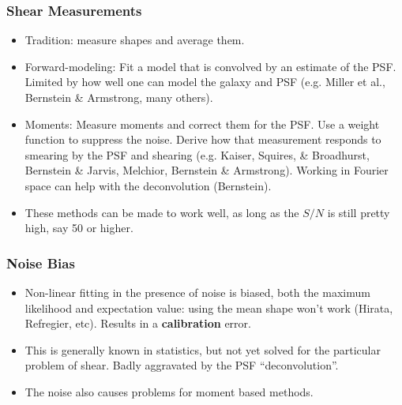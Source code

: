 \documentclass{beamer}
\begin{document}



\frame
{
    \frametitle{Shear Measurements}
    
    \begin{itemize}

        \item Tradition: measure shapes and average them.

        \item Forward-modeling: Fit a model that is convolved by an estimate of
            the PSF. Limited by how well one can model the galaxy and PSF (e.g.
            Miller et al., Bernstein \& Armstrong, many others).

        \item Moments: Measure moments and correct them for the PSF.  Use a
            weight function to suppress the noise. Derive how that measurement
            responds to smearing by the PSF and shearing (e.g.  Kaiser,
            Squires, \& Broadhurst, Bernstein \& Jarvis, Melchior, Bernstein \&
            Armstrong).  Working in Fourier space can help with the
            deconvolution (Bernstein).

        \item These methods can be made to work well, as long as the $S/N$ is
            still pretty high, say 50 or higher.

    \end{itemize}
}

\frame
{
    \frametitle{Noise Bias}

    \begin{itemize}

        \item Non-linear fitting in the presence of noise is biased, both the
            maximum likelihood and expectation value: using the mean shape
            won't work (Hirata, Refregier, etc).   Results in a {\bf
            calibration} error.

        \item This is generally known in statistics, but not yet solved for
            the particular problem of shear. Badly aggravated by the PSF
            ``deconvolution''.

        \item The noise also causes problems for moment based methods.

    \end{itemize}
}
\end{document}
